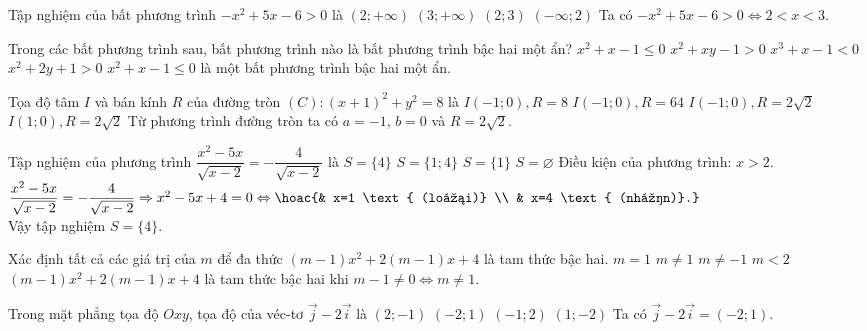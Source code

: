 \begin{ex}%
	Tập nghiệm của bất phương trình $-x^2+5x-6>0$ là
	\choice
	{ $(2 ;+\infty)$}
	{ $(3 ;+\infty)$}
	{ \True $(2 ; 3)$}
	{ $(-\infty ; 2)$}
	\loigiai
	{
		Ta có  $-x^2+5x-6>0 \Leftrightarrow 2<x<3$.
	}
\end{ex}
\begin{ex}%
	Trong các bất phương trình sau, bất phương trình nào là bất phương trình bậc hai một ẩn?
	\choice
	{ \True $x^2+x-1 \leq 0$}
	{$x^2+x y-1>0$}
	{$x^3+x-1<0$}
	{$x^2+2 y+1>0$}
	\loigiai
	{
		$x^2+x-1 \leq 0$ là một  bất phương trình bậc hai một ẩn.
	}
\end{ex}
\begin{ex}%
	Tọa độ tâm $I$ và bán kính $R$ của đường tròn $(C) \colon (x+1)^2+y^2=8$ là
	\choice
	{$I(-1 ; 0), R=8$}
	{$I(-1 ; 0), R=64$}
	{ \True $I(-1 ; 0), R=2 \sqrt{2}$}
	{$I(1 ; 0), R=2 \sqrt{2}$}
	\loigiai
	{
		Từ phương trình đường tròn ta có $a=-1$, $b=0$ và $R=2 \sqrt{2}$.
	}
\end{ex}
\begin{ex}%
	Tập nghiệm của phương trình $\dfrac{x^2-5x}{\sqrt{x-2}}=-\dfrac{4}{\sqrt{x-2}}$ là
	\choice
	{ \True $S=\{4\}$}
	{ $S=\{1 ; 4\}$}
	{$S=\{1\}$}
	{ $S=\varnothing$}
	\loigiai
	{
		Điều kiện của phương trình: $x>2$.\\
		$\dfrac{x^2-5x}{\sqrt{x-2}}=-\dfrac{4}{\sqrt{x-2}}\Rightarrow x^2-5x+4=0\Leftrightarrow\hoac{& x=1 \text{ (loại)} \\ & x=4 \text{ (nhận)}.}$\\
		Vậy tập nghiệm $S=\{4\}$.
	}
\end{ex}
\begin{ex}%
	Xác định tất cả các giá trị của $m$ để đa thức $(m-1)x^2+2(m-1) x+4$ là tam thức bậc hai.
	\choice
	{$m=1$}
	{ \True $m \neq 1$}
	{ $m \neq-1$}
	{ $m<2$}
	\loigiai
	{
		$(m-1)x^2+2(m-1) x+4$ là tam thức bậc hai khi $m-1\ne 0\Leftrightarrow m \ne 1$.
	}
\end{ex}
\begin{ex}%
	Trong mặt phẳng tọa độ $Oxy$, tọa độ của véc-tơ $\vec{j}-2 \vec{i}$ là
	\choice
	{ $(2 ;-1)$}
	{ \True $(-2 ; 1)$}
	{ $(-1 ; 2)$}
	{ $(1 ;-2)$}
	\loigiai
	{
		Ta có $\vec{j}-2\vec{i}=(-2 ; 1)$.
	}
\end{ex}
